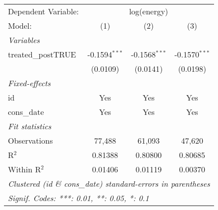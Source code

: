 
\begin{tabular}{lccc}
   \tabularnewline\midrule\midrule
   Dependent Variable: & \multicolumn{3}{c}{log(energy)}\\
   Model:             & (1)             & (2)             & (3)\\
   \midrule \emph{Variables} &   &   &  \\
   treated\_postTRUE & -0.1594$^{***}$ & -0.1568$^{***}$ & -0.1570$^{***}$\\
                      & (0.0109)        & (0.0141)        & (0.0198)\\
   \midrule \emph{Fixed-effects} &   &   &  \\
   id                 & Yes             & Yes             & Yes\\
   cons\_date        & Yes             & Yes             & Yes\\
   \midrule \emph{Fit statistics} &   &   &  \\
   Observations       & 77,488          & 61,093          & 47,620\\
   R$^2$              & 0.81388         & 0.80800         & 0.80685\\
   Within R$^2$       & 0.01406         & 0.01119         & 0.00370\\
   \midrule\midrule\multicolumn{4}{l}{\emph{Clustered (id \& cons\_date) standard-errors in parentheses}}\\
   \multicolumn{4}{l}{\emph{Signif. Codes: ***: 0.01, **: 0.05, *: 0.1}}\\
\end{tabular}


